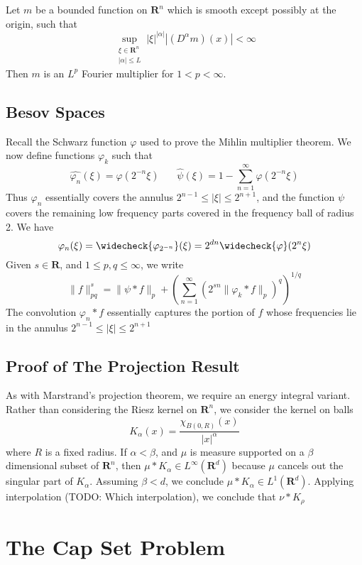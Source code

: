 \begin{theorem}
	Let $m$ be a bounded function on $\mathbf{R}^n$ which is smooth except possibly at the origin, such that
	\[ \sup_{\substack{\xi \in \mathbf{R}^n\\|\alpha| \leq L}} |\xi|^{|\alpha|} |(D^\alpha m)(x)| < \infty \]
	Then $m$ is an $L^p$ Fourier multiplier for $1 < p < \infty$.
\end{theorem}

\section{Besov Spaces}

Recall the Schwarz function $\varphi$ used to prove the Mihlin multiplier theorem. We now define functions $\varphi_k$ such that
%
\[ \widehat{\varphi_n}(\xi) = \varphi(2^{-n} \xi)\ \ \ \ \ \ \ \ \widehat{\psi}(\xi) = 1 - \sum_{n = 1}^\infty \varphi(2^{-n} \xi) \]
%
Thus $\varphi_n$ essentially covers the annulus $2^{n-1} \leq |\xi| \leq 2^{n+1}$, and the function $\psi$ covers the remaining low frequency parts covered in the frequency ball of radius 2. We have
%
\[ \varphi_n(\xi) = \widecheck{\varphi_{2^{-n}}}(\xi) = 2^{dn} \widecheck{\varphi}(2^n \xi) \]
%
Given $s \in \mathbf{R}$, and $1 \leq p, q \leq \infty$, we write
%
\[ \| f \|_{pq}^s = \| \psi * f \|_p + \left( \sum_{n = 1}^\infty (2^{sn} \| \varphi_k * f \|_p)^q \right)^{1/q} \]
%
The convolution $\varphi_n * f$ essentially captures the portion of $f$ whose frequencies lie in the annulus $2^{n-1} \leq |\xi| \leq 2^{n+1}$

\section{Proof of The Projection Result}

As with Marstrand's projection theorem, we require an energy integral variant. Rather than considering the Riesz kernel on $\mathbf{R}^n$, we consider the kernel on balls
%
\[ K_\alpha(x) = \frac{\chi_{B(0,R)}(x)}{|x|^\alpha} \]
%
where $R$ is a fixed radius. If $\alpha < \beta$, and $\mu$ is measure supported on a $\beta$ dimensional subset of $\mathbf{R}^n$, then $\mu * K_\alpha \in L^\infty(\mathbf{R}^d)$ because $\mu$ cancels out the singular part of $K_\alpha$. Assuming $\beta < d$, we conclude $\mu * K_\alpha \in L^1(\mathbf{R}^d)$. Applying interpolation (TODO: Which interpolation), we conclude that $\nu * K_\rho$ 

\chapter{The Cap Set Problem}

